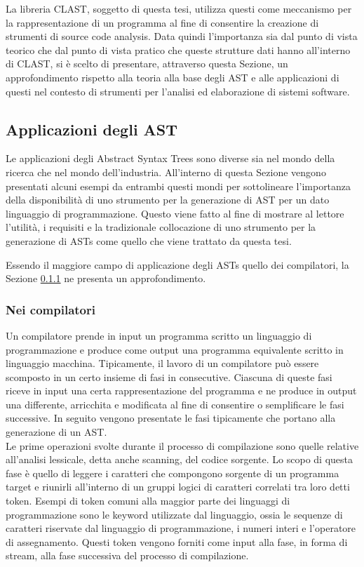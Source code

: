 La libreria CLAST, soggetto di questa tesi, utilizza questi come meccanismo per
la rappresentazione di un programma al fine di consentire la creazione di
strumenti di source code analysis. Data quindi l'importanza sia dal punto di
vista teorico che dal punto di vista pratico che queste strutture dati hanno
all'interno di CLAST, si è scelto di presentare, attraverso questa Sezione, un
approfondimento rispetto alla teoria alla base degli AST e alle applicazioni di
questi nel contesto di strumenti per l'analisi ed elaborazione di sistemi
software.

\subsection{Applicazioni degli AST}

Le applicazioni degli Abstract Syntax Trees sono diverse sia nel mondo della
ricerca che nel mondo dell’industria. All’interno di questa Sezione vengono
presentati alcuni esempi da entrambi questi mondi per sottolineare l’importanza
della disponibilità di uno strumento per la generazione di AST per un dato
linguaggio di programmazione. Questo viene fatto al fine di mostrare al lettore
l’utilità, i requisiti e la tradizionale collocazione di uno strumento per la
generazione di ASTs come quello che viene trattato da questa tesi.

Essendo il maggiore campo di applicazione degli ASTs quello dei compilatori, la
Sezione \ref{ast-compilers} ne presenta un approfondimento.

\subsubsection{Nei compilatori}
\label{ast-compilers}

Un compilatore prende in input un programma scritto un linguaggio di
programmazione e produce come output una programma equivalente scritto in
linguaggio macchina. Tipicamente, il lavoro di un compilatore può essere
scomposto in un certo insieme di fasi in consecutive. Ciascuna di queste fasi
riceve in input una certa rappresentazione del programma e ne produce in output
una differente, arricchita e modificata al fine di consentire o semplificare le
fasi successive. In seguito vengono presentate le fasi tipicamente che portano
alla generazione di un AST.\\

Le prime operazioni svolte durante il processo di compilazione sono quelle
relative all’analisi lessicale, detta anche scanning, del codice sorgente. Lo
scopo di questa fase è quello di leggere i caratteri che compongono sorgente di
un programma target e riunirli all’interno di un gruppi logici di caratteri
correlati tra loro detti token. Esempi di token comuni alla maggior parte dei
linguaggi di programmazione sono le keyword utilizzate dal linguaggio, ossia le
sequenze di caratteri riservate dal linguaggio di programmazione, i numeri
interi e l’operatore di assegnamento. Questi token vengono forniti come input
alla fase, in forma di stream, alla fase successiva del processo di
compilazione.\\

